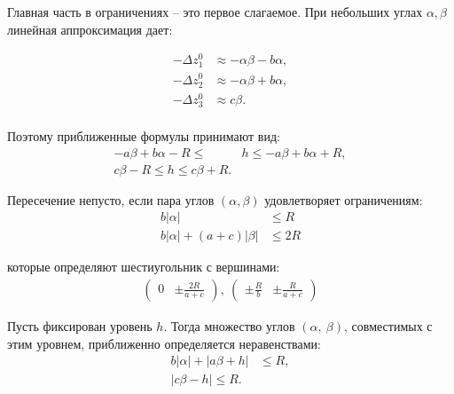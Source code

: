 Главная часть в ограничениях -- это первое слагаемое. При небольших углах $\alpha, \beta$ линейная аппроксимация дает:

\begin{equation}
\begin{aligned}
-\Delta z_1^0 & \approx -\alpha\beta - b\alpha, \\
-\Delta z_2^0 & \approx -\alpha\beta + b\alpha, \\
-\Delta z_3^0 & \approx c\beta. \\
\end{aligned}
\end{equation}

Поэтому приближенные формулы принимают вид:
\begin{equation}
\begin{aligned}
-a\beta + b\alpha - R \leq & h \leq -a\beta + b\alpha + R, \\
c\beta - R \leq h \leq c\beta + R.
\end{aligned}
\end{equation}

Пересечение непусто, если пара углов $\left(\alpha,\beta\right)$ удовлетворяет ограничениям:
\begin{equation}
\begin{aligned}
	b\left|\alpha\right| & \leq R \\
	b\left|\alpha\right| + \left(a+c\right)\left|\beta\right| & \leq 2R
\end{aligned}
\end{equation}

которые определяют шестиугольник с вершинами:
\begin{equation}
\begin{aligned}
	\begin{pmatrix}0 & \pm\frac{2R}{a+c}\end{pmatrix}, ~\begin{pmatrix}\pm\frac{R}{b} & \pm\frac{R}{a+c}\end{pmatrix}
\end{aligned}
\end{equation}

Пусть фиксирован уровень $h$. Тогда множество углов $\left(\alpha,~\beta\right)$, совместимых с этим уровнем, приближенно определяется неравенствами:
\begin{equation}
\begin{aligned}
	b\left|\alpha\right| + \left|a\beta + h\right| &\leq R, \\
	\left|c\beta - h\right| \leq R.
\end{aligned}
\end{equation}

